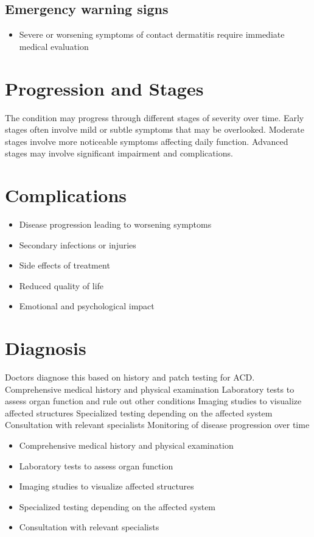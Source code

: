 \subsection{Emergency warning signs}
\begin{itemize}[noitemsep]
  \item Severe or worsening symptoms of contact dermatitis require immediate medical evaluation
\end{itemize}
\section{Progression and Stages}
The condition may progress through different stages of severity over time. Early stages often involve mild or subtle symptoms that may be overlooked. Moderate stages involve more noticeable symptoms affecting daily function. Advanced stages may involve significant impairment and complications.
\section{Complications}
\begin{itemize}[noitemsep]
  \item Disease progression leading to worsening symptoms
  \item Secondary infections or injuries
  \item Side effects of treatment
  \item Reduced quality of life
  \item Emotional and psychological impact
\end{itemize}
\section{Diagnosis}
Doctors diagnose this based on history and patch testing for ACD. Comprehensive medical history and physical examination Laboratory tests to assess organ function and rule out other conditions Imaging studies to visualize affected structures Specialized testing depending on the affected system Consultation with relevant specialists Monitoring of disease progression over time

\begin{itemize}[noitemsep]
  \item Comprehensive medical history and physical examination
  \item Laboratory tests to assess organ function
  \item Imaging studies to visualize affected structures
  \item Specialized testing depending on the affected system
  \item Consultation with relevant specialists
\end{itemize}
